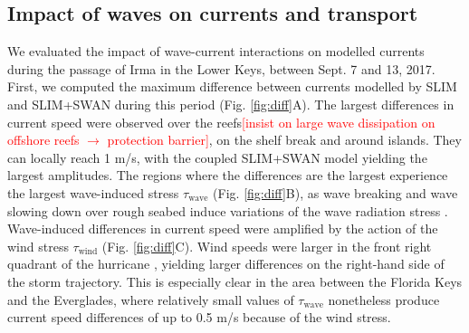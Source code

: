 \documentclass[preprint,12pt,authoryear]{elsarticle}
\begin{document}
\subsection{Impact of waves on currents and transport}

We evaluated the impact of wave-current interactions on modelled currents during the passage of Irma in the Lower Keys, between Sept. 7 and 13, 2017. First, we computed the maximum difference between currents modelled by SLIM and SLIM+SWAN during this period (Fig. \ref{fig:diff}A). The largest differences in current speed were observed over the reefs\textcolor{red}{[insist on large wave dissipation on offshore reefs $\rightarrow$ protection barrier]}, on the shelf break and around islands. They can locally reach 1 m/s, with the coupled SLIM+SWAN model yielding the largest amplitudes. The regions where the differences are the largest experience the largest wave-induced stress {\boldmath$\tau$}$_\text{wave}$ (Fig. \ref{fig:diff}B), as wave breaking and wave slowing down over rough seabed induce variations of the wave radiation stress \citep{longuet1964radiation}. Wave-induced differences in current speed were amplified by the action of the wind stress {\boldmath$\tau$}$_\text{wind}$ (Fig. \ref{fig:diff}C). Wind speeds were larger in the front right quadrant of the hurricane \citep{zedler2009ocean}, yielding larger differences on the right-hand side of the storm trajectory. This is especially clear in the area between the Florida Keys and the Everglades, where relatively small values of {\boldmath$\tau$}$_\text{wave}$ nonetheless produce current speed differences of up to 0.5 m/s because of the wind stress.
\end{document}
